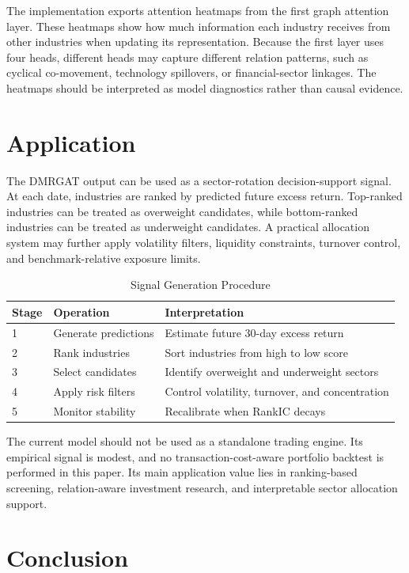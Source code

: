 \documentclass[12pt]{article}
\begin{document}
The implementation exports attention heatmaps from the first graph attention layer. These heatmaps show how much information each industry receives from other industries when updating its representation. Because the first layer uses four heads, different heads may capture different relation patterns, such as cyclical co-movement, technology spillovers, or financial-sector linkages. The heatmaps should be interpreted as model diagnostics rather than causal evidence.

\section{Application}
\label{sec:application}

The DMRGAT output can be used as a sector-rotation decision-support signal. At each date, industries are ranked by predicted future excess return. Top-ranked industries can be treated as overweight candidates, while bottom-ranked industries can be treated as underweight candidates. A practical allocation system may further apply volatility filters, liquidity constraints, turnover control, and benchmark-relative exposure limits.

\begin{table}[H]
\centering
\caption{Signal Generation Procedure}
\begin{tabular}{lll}
\toprule
Stage & Operation & Interpretation \\
\midrule
1 & Generate predictions & Estimate future 30-day excess return \\
2 & Rank industries & Sort industries from high to low score \\
3 & Select candidates & Identify overweight and underweight sectors \\
4 & Apply risk filters & Control volatility, turnover, and concentration \\
5 & Monitor stability & Recalibrate when RankIC decays \\
\bottomrule
\end{tabular}
\end{table}

The current model should not be used as a standalone trading engine. Its empirical signal is modest, and no transaction-cost-aware portfolio backtest is performed in this paper. Its main application value lies in ranking-based screening, relation-aware investment research, and interpretable sector allocation support.

\section{Conclusion}
\label{sec:conclusion}
\end{document}
